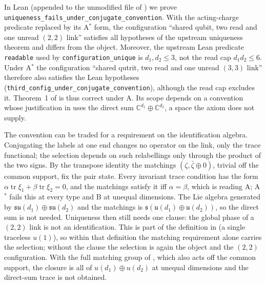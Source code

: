 \documentclass[11pt]{article}
\newcommand{\ident}[1]{\nolinkurl{#1}}
\theoremstyle{remark}
\begin{document}
In Lean (appended to the unmodified file of \cite{wg}) we prove \ident{uniqueness_fails_under_conjugate_convention}. With the acting-charge predicate replaced by its A$^*$ form, the configuration ``shared qubit, two read and one unread $(2,2)$ link'' satisfies all hypotheses of the upstream uniqueness theorem and differs from the object. Moreover, the upstream Lean predicate \texttt{readable} used by \ident{configuration_unique} is $d_1,d_2\le3$, not the read cap $d_1d_2\le6$. Under A$^*$ the configuration ``shared qutrit, two read and one unread $(3,3)$ link'' therefore also satisfies the Lean hypotheses (\ident{third_config_under_conjugate_convention}), although the read cap excludes it. Theorem~1 of \cite{wg} is thus correct under A. Its scope depends on a convention whose justification in \cite[Secs.~S3--S4]{wg} uses the direct sum $\mathbb C^{d_1}\oplus\mathbb C^{d_2}$, a space the axiom does not supply.

The convention can be traded for a requirement on the identification algebra. Conjugating the labels at one end changes no operator on the link, only the trace functional; the selection depends on such relabellings only through the product of the two signs. By the transpose identity the matchings $(\zeta,\bar\zeta\oplus0)$, trivial off the common support, fix the pair state. Every invariant trace condition has the form $\alpha\operatorname{tr}\xi_1+\beta\operatorname{tr}\xi_2=0$, and the matchings satisfy it iff $\alpha=\beta$, which is reading A; A$^*$ fails this at every type and B at unequal dimensions. The Lie algebra generated by $\mathfrak{su}(d_1)\oplus\mathfrak{su}(d_2)$ and the matchings is $\mathfrak s(\mathfrak u(d_1)\oplus\mathfrak u(d_2))$, so the direct sum is not needed. Uniqueness then still needs one clause: the global phase of a $(2,2)$ link is not an identification. This is part of the definition in \cite{wg} (a single traceless $u(1)$), so within that definition the matching requirement alone carries the selection; without the clause the selection is again the object and the $(2,2)$ configuration. With the full matching group of \cite[Lemma~S-matching]{wg}, which also acts off the common support, the closure is all of $u(d_1)\oplus u(d_2)$ at unequal dimensions and the direct-sum trace is not obtained.
\end{document}
